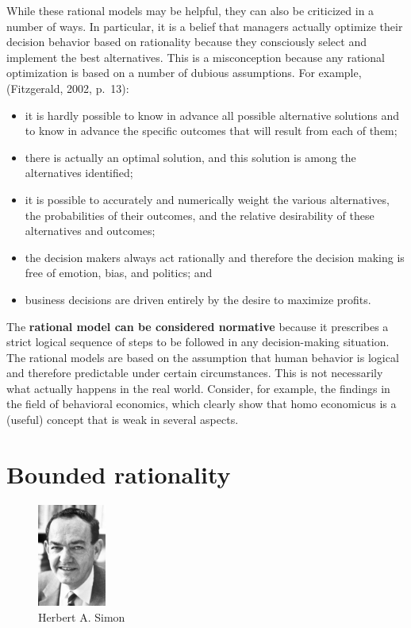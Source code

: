 \documentclass[
  12pt,
  oneside]{book}
\providecommand{\tightlist}{%
  \setlength{\itemsep}{0pt}\setlength{\parskip}{0pt}}
\theoremstyle{definition}
\theoremstyle{definition}
\theoremstyle{definition}
\theoremstyle{definition}
\theoremstyle{remark}
\begin{document}
While these rational models may be helpful, they can also be criticized in a number of ways. In particular, it is a belief that managers actually optimize their decision behavior based on rationality because they consciously select and implement the best alternatives. This is a misconception because any rational optimization is based on a number of dubious assumptions. For example, (Fitzgerald, 2002, p.~13):

\begin{itemize}
\tightlist
\item
  it is hardly possible to know in advance all possible alternative solutions and to know in advance the specific outcomes that will result from each of them;
\item
  there is actually an optimal solution, and this solution is among the alternatives identified;
\item
  it is possible to accurately and numerically weight the various alternatives, the probabilities of their outcomes, and the relative desirability of these alternatives and outcomes;
\item
  the decision makers always act rationally and therefore the decision making is free of emotion, bias, and politics; and
\item
  business decisions are driven entirely by the desire to maximize profits.
\end{itemize}

The \textbf{rational model can be considered normative} because it prescribes a strict logical sequence of steps to be followed in any decision-making situation. The rational models are based on the assumption that human behavior is logical and therefore predictable under certain circumstances. This is not necessarily what actually happens in the real world. Consider, for example, the findings in the field of behavioral economics, which clearly show that homo economicus is a (useful) concept that is weak in several aspects.

\section{Bounded rationality}\label{bounded-rationality}

\begin{figure}
\centering
\includegraphics[width=0.2\textwidth,height=\textheight]{fig/herbert-simon.jpg}
\caption[\label{fig:simon} Herbert A. Simon]{\label{fig:simon} Herbert A. Simon\footnotemark{}}
\end{figure}
\end{document}
